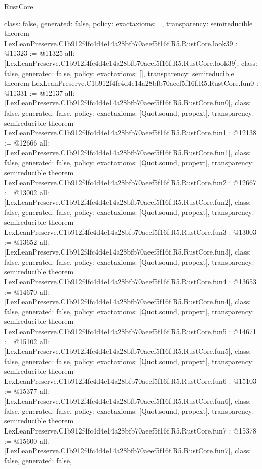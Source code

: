 \begin{lexlean}{RustCore}
\begin{coremodule}
{  class: false,
  generated: false,
  policy: exact{axioms: []},
  transparency: semireducible
}
theorem LexLeanPreserve.C1b912f4fc4d4e14a28bfb70aeef5f16f.R5.RustCore.look39 : @11323 := @11325 {
  all: [LexLeanPreserve.C1b912f4fc4d4e14a28bfb70aeef5f16f.R5.RustCore.look39],
  class: false,
  generated: false,
  policy: exact{axioms: []},
  transparency: semireducible
}
theorem LexLeanPreserve.C1b912f4fc4d4e14a28bfb70aeef5f16f.R5.RustCore.fun0 : @11331 := @12137 {
  all: [LexLeanPreserve.C1b912f4fc4d4e14a28bfb70aeef5f16f.R5.RustCore.fun0],
  class: false,
  generated: false,
  policy: exact{axioms: [Quot.sound, propext]},
  transparency: semireducible
}
theorem LexLeanPreserve.C1b912f4fc4d4e14a28bfb70aeef5f16f.R5.RustCore.fun1 : @12138 := @12666 {
  all: [LexLeanPreserve.C1b912f4fc4d4e14a28bfb70aeef5f16f.R5.RustCore.fun1],
  class: false,
  generated: false,
  policy: exact{axioms: [Quot.sound, propext]},
  transparency: semireducible
}
theorem LexLeanPreserve.C1b912f4fc4d4e14a28bfb70aeef5f16f.R5.RustCore.fun2 : @12667 := @13002 {
  all: [LexLeanPreserve.C1b912f4fc4d4e14a28bfb70aeef5f16f.R5.RustCore.fun2],
  class: false,
  generated: false,
  policy: exact{axioms: [Quot.sound, propext]},
  transparency: semireducible
}
theorem LexLeanPreserve.C1b912f4fc4d4e14a28bfb70aeef5f16f.R5.RustCore.fun3 : @13003 := @13652 {
  all: [LexLeanPreserve.C1b912f4fc4d4e14a28bfb70aeef5f16f.R5.RustCore.fun3],
  class: false,
  generated: false,
  policy: exact{axioms: [Quot.sound, propext]},
  transparency: semireducible
}
theorem LexLeanPreserve.C1b912f4fc4d4e14a28bfb70aeef5f16f.R5.RustCore.fun4 : @13653 := @14670 {
  all: [LexLeanPreserve.C1b912f4fc4d4e14a28bfb70aeef5f16f.R5.RustCore.fun4],
  class: false,
  generated: false,
  policy: exact{axioms: [Quot.sound, propext]},
  transparency: semireducible
}
theorem LexLeanPreserve.C1b912f4fc4d4e14a28bfb70aeef5f16f.R5.RustCore.fun5 : @14671 := @15102 {
  all: [LexLeanPreserve.C1b912f4fc4d4e14a28bfb70aeef5f16f.R5.RustCore.fun5],
  class: false,
  generated: false,
  policy: exact{axioms: [Quot.sound, propext]},
  transparency: semireducible
}
theorem LexLeanPreserve.C1b912f4fc4d4e14a28bfb70aeef5f16f.R5.RustCore.fun6 : @15103 := @15377 {
  all: [LexLeanPreserve.C1b912f4fc4d4e14a28bfb70aeef5f16f.R5.RustCore.fun6],
  class: false,
  generated: false,
  policy: exact{axioms: [Quot.sound, propext]},
  transparency: semireducible
}
theorem LexLeanPreserve.C1b912f4fc4d4e14a28bfb70aeef5f16f.R5.RustCore.fun7 : @15378 := @15600 {
  all: [LexLeanPreserve.C1b912f4fc4d4e14a28bfb70aeef5f16f.R5.RustCore.fun7],
  class: false,
  generated: false,
}
\end{coremodule}
\end{lexlean}
